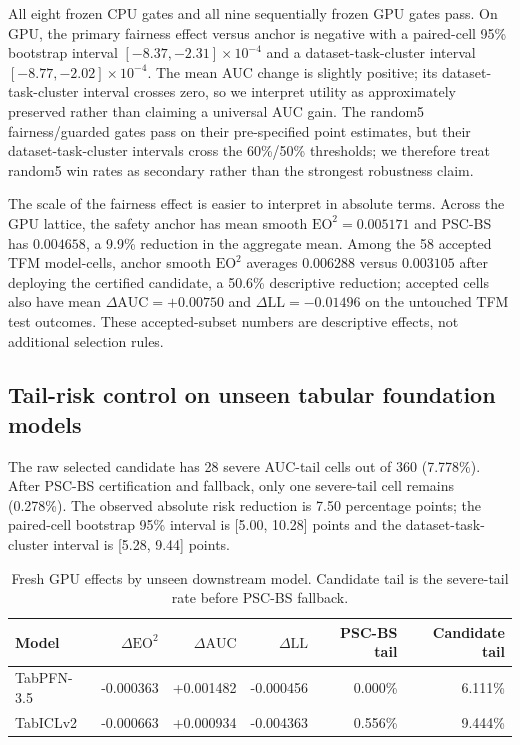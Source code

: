 \documentclass[10pt]{article}
\newcommand{\PSC}{\textsc{PSC-BS}}
\newcommand{\eo}{\mathrm{EO}^2}
\newcommand{\AUC}{\mathrm{AUC}}
\newcommand{\LL}{\mathrm{LL}}
\begin{document}
All eight frozen CPU gates and all nine sequentially frozen GPU gates pass.
On GPU, the primary fairness effect versus anchor is negative with a paired-cell 95\% bootstrap interval $[-8.37,-2.31]\times10^{-4}$ and a dataset-task-cluster interval $[-8.77,-2.02]\times10^{-4}$.
The mean AUC change is slightly positive; its dataset-task-cluster interval crosses zero, so we interpret utility as approximately preserved rather than claiming a universal AUC gain.
The random5 fairness/guarded gates pass on their pre-specified point estimates, but their dataset-task-cluster intervals cross the 60\%/50\% thresholds; we therefore treat random5 win rates as secondary rather than the strongest robustness claim.

The scale of the fairness effect is easier to interpret in absolute terms.
Across the GPU lattice, the safety anchor has mean smooth $\eo=0.005171$ and \PSC{} has $0.004658$, a 9.9\% reduction in the aggregate mean.
Among the 58 accepted TFM model-cells, anchor smooth $\eo$ averages $0.006288$ versus $0.003105$ after deploying the certified candidate, a 50.6\% descriptive reduction; accepted cells also have mean $\Delta\AUC=+0.00750$ and $\Delta\LL=-0.01496$ on the untouched TFM test outcomes.
These accepted-subset numbers are descriptive effects, not additional selection rules.

\subsection{Tail-risk control on unseen tabular foundation models}

The raw selected candidate has 28 severe AUC-tail cells out of 360 (7.778\%).
After \PSC{} certification and fallback, only one severe-tail cell remains (0.278\%).
The observed absolute risk reduction is 7.50 percentage points; the paired-cell bootstrap 95\% interval is [5.00, 10.28] points and the dataset-task-cluster interval is [5.28, 9.44] points.

\begin{table}[t]
\centering
\caption{Fresh GPU effects by unseen downstream model. Candidate tail is the severe-tail rate before \PSC{} fallback.}
\label{tab:tfm}
\small
\begin{tabular}{lrrrrr}
\toprule
Model & $\Delta\eo$ & $\Delta\AUC$ & $\Delta\LL$ & \PSC{} tail & Candidate tail \\
\midrule
TabPFN-3.5 & -0.000363 & +0.001482 & -0.000456 & 0.000\% & 6.111\% \\
TabICLv2 & -0.000663 & +0.000934 & -0.004363 & 0.556\% & 9.444\% \\
\bottomrule
\end{tabular}
\end{table}
\end{document}
